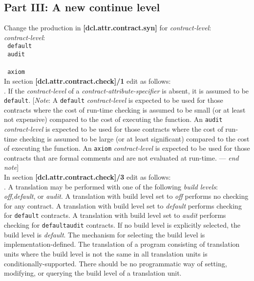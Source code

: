 \subsection{Part III: A new continue level}

\noindent Change the production in \textbf{[dcl.attr.contract.syn]} for \emph{contract-level}:
\\

\noindent\emph{contract-level}:\\
\indent\texttt{ default}\\
\indent\texttt{ audit}\\
\indent{}\\
\indent\texttt{ axiom}\\

In section \textbf{[dcl.attr.contract.check]/1} edit as follows:\\

.
If the \emph{contract-level} of a \emph{contract-attribute-specifier} is absent, it is
assumed to be \texttt{default}. 
[\emph{Note}: A \texttt{default} \emph{contract-level} is expected to be
used for those contracts where the cost of run-time checking is assumed to be
small (or at least not expensive) compared to the cost of executing the
function. 
An \texttt{audit} \emph{contract-level} is expected to be used for those contracts
where the cost of run-time checking is assumed to be large (or at least
significant) compared to the cost of executing the function.
An \texttt{axiom} \emph{contract-level} is expected to be used for those contracts that are formal
comments and are not evaluated at run-time. 
--- \emph{end note}]\\

In section \textbf{[dcl.attr.contract.check]/3} edit as follows:\\

.
A translation may be performed with one of the following \emph{build levels}: 
\emph{off},\emph{default}, or \emph{audit}. 
A translation with build level set to \emph{off} performs no
checking for any contract. 
A translation with build level set to \emph{default}
performs checking for \texttt{default} contracts. 
A translation with build level set to \emph{audit} 
performs checking for 
\texttt{default}\add{,}\texttt{audit} contracts. 
If no build level is explicitly selected, the build level is \emph{default}. 
The mechanism for selecting the build level is implementation-defined. 
The translation of a program consisting of translation units where the build 
level is not the same in all translation units is conditionally-supported. 
There should be no programmatic
way of setting, modifying, or querying the build level of a translation unit.\\

